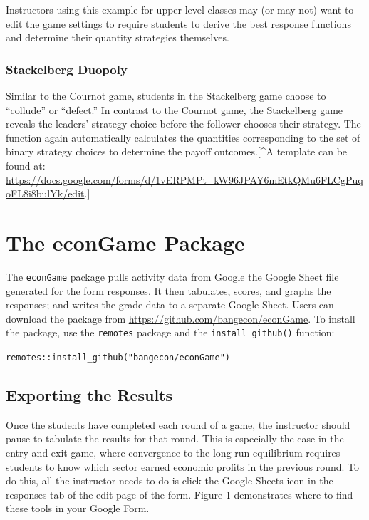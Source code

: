\documentclass[
]{article}
\begin{document}
Instructors using this example for upper-level classes may (or may not)
want to edit the game settings to require students to derive the best
response functions and determine their quantity strategies themselves.

\hypertarget{stackelberg-duopoly}{%
\subsubsection{Stackelberg Duopoly}\label{stackelberg-duopoly}}

Similar to the Cournot game, students in the Stackelberg game choose to
``collude'' or ``defect.'' In contrast to the Cournot game, the
Stackelberg game reveals the leaders' strategy choice before the
follower chooses their strategy. The function again automatically
calculates the quantities corresponding to the set of binary strategy
choices to determine the payoff outcomes.{[}\^{}A template can be found
at:
\url{https://docs.google.com/forms/d/1vERPMPt_kW96JPAY6mEtkQMu6FLCgPuqoFL8i8bulYk/edit}.{]}

\hypertarget{the-econgame-package}{%
\section{The econGame Package}\label{the-econgame-package}}

The \texttt{econGame} package pulls activity data from Google the Google
Sheet file generated for the form responses. It then tabulates, scores,
and graphs the responses; and writes the grade data to a separate Google
Sheet. Users can download the package from
\url{https://github.com/bangecon/econGame}. To install the package, use
the \texttt{remotes} package and the \texttt{install\_github()}
function:

\texttt{remotes::install\_github("bangecon/econGame")}

\hypertarget{exporting-the-results}{%
\subsection{Exporting the Results}\label{exporting-the-results}}

Once the students have completed each round of a game, the instructor
should pause to tabulate the results for that round. This is especially
the case in the entry and exit game, where convergence to the long-run
equilibrium requires students to know which sector earned economic
profits in the previous round. To do this, all the instructor needs to
do is click the Google Sheets icon in the responses tab of the edit page
of the form. Figure 1 demonstrates where to find these tools in your
Google Form.
\end{document}
